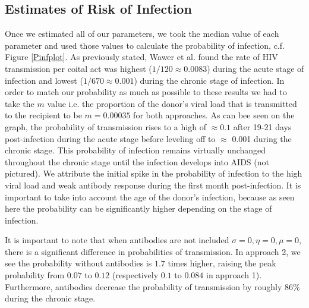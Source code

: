 \documentclass[]{elsarticle}
\theoremstyle{definition}
\begin{document}
\subsection{Estimates of Risk of Infection}
Once we estimated all of our parameters, we took the median value of each parameter and used those values to calculate the probability of infection, c.f. Figure \ref{Pinfplot}. As previously stated, Wawer et al. \cite{Uganda} found the rate of HIV transmission per coital act was highest ($1/120 \approx 0.0083$) during the acute stage of infection and lowest ($1/670 \approx 0.001$) during the chronic stage of infection. In order to match our probability as much as possible to these results we had to take the $m$ value i.e. the proportion of the donor's viral load that is transmitted to the recipient to be $m = 0.00035$ for both approaches.
As can bee seen on the graph, the probability of transmission rises to a high of $\approx 0.1$ after 19-21 days post-infection during the acute stage before leveling off to $\approx$ 0.001 during the chronic stage. This probability of infection remains virtually unchanged throughout the chronic stage until the infection develops into AIDS (not pictured). We attribute the initial spike in the probability of infection to the high viral load and weak antibody response during the first month post-infection. It is important to take into account the age of the donor's infection, because as seen here the probability can be significantly higher depending on the stage of infection.

It is important to note that when antibodies are not included $\sigma = 0, \eta = 0, \mu = 0$, there is a significant difference in probabilities of transmission. In approach 2, we see the probability without antibodies is $1.7$ times higher, raising the peak probability from $0.07$ to $0.12$ (respectively $0.1$ to $0.084$ in approach 1). Furthermore, antibodies decrease the probability of transmission by roughly $86\%$ during the chronic stage.
\end{document}
